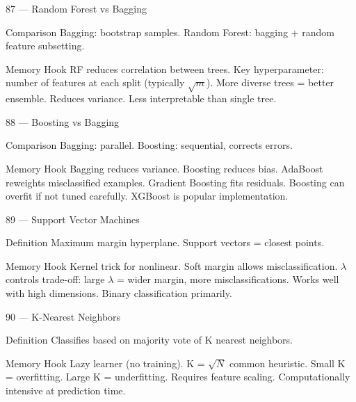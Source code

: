 \documentclass[aspectratio=169,8pt]{beamer}
\begin{document}
	\begin{frame}{87 --- Random Forest vs Bagging}
		\begin{block}{Comparison}
			Bagging: bootstrap samples. Random Forest: bagging + random feature subsetting.
		\end{block}
		\begin{block}{Memory Hook}
			RF reduces correlation between trees. Key hyperparameter: number of features at each split (typically $\sqrt{m}$). More diverse trees = better ensemble. Reduces variance. Less interpretable than single tree.
		\end{block}
	\end{frame}
	
	\begin{frame}{88 --- Boosting vs Bagging}
		\begin{block}{Comparison}
			Bagging: parallel. Boosting: sequential, corrects errors.
		\end{block}
		\begin{block}{Memory Hook}
			Bagging reduces variance. Boosting reduces bias. AdaBoost reweights misclassified examples. Gradient Boosting fits residuals. Boosting can overfit if not tuned carefully. XGBoost is popular implementation.
		\end{block}
	\end{frame}
	
	\begin{frame}{89 --- Support Vector Machines}
		\begin{block}{Definition}
			Maximum margin hyperplane. Support vectors = closest points.
		\end{block}
		\begin{block}{Memory Hook}
			Kernel trick for nonlinear. Soft margin allows misclassification. $\lambda$ controls trade-off: large $\lambda$ = wider margin, more misclassifications. Works well with high dimensions. Binary classification primarily.
		\end{block}
	\end{frame}
	
	\begin{frame}{90 --- K-Nearest Neighbors}
		\begin{block}{Definition}
			Classifies based on majority vote of K nearest neighbors.
		\end{block}
		\begin{block}{Memory Hook}
			Lazy learner (no training). K = $\sqrt{N}$ common heuristic. Small K = overfitting. Large K = underfitting. Requires feature scaling. Computationally intensive at prediction time.
		\end{block}
	\end{frame}
	
\end{document}

